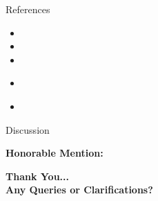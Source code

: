 \documentclass[xcolor=table]{beamer}
\begin{document}
\begin{frame}{References}

\fontsize{10}\selectfont
\nocite{*}
	\begin{itemize}
		\item {}  
	 \item {} 
	 \item {} 
		\item {}\\  
	 \item {} 

	\end{itemize}

\end{frame}
\begin{frame}{Discussion} \vspace{5pt}



	 \textbf{Honorable Mention:}\\
\fontsize{8}\selectfont
{}  

	\Large \textbf{Thank You...}\\
	\Large \textbf{Any Queries or Clarifications?}
	

\end{frame}
\end{document}
